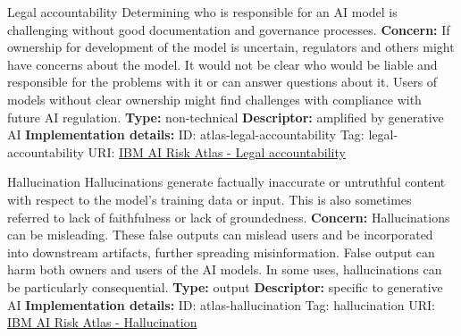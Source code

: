 \begin{definitionbox}{Legal accountability}
Determining who is responsible for an AI model is challenging without good documentation and governance processes.\newline\newline
\textbf{Concern: }If ownership for development of the model is uncertain, regulators and others might have concerns about the model. It would not be clear who would be liable and responsible for the problems with it or can answer questions about it. Users of models without clear ownership might find challenges with compliance with future AI regulation.\newline\newline
\textbf{Type: }non-technical\newline
\textbf{Descriptor: }amplified by generative AI \newline\newline
\textbf{Implementation details: } \newline
ID: atlas-legal-accountability \newline
Tag: legal-accountability \newline
URI:  \href{https://www.ibm.com/docs/en/watsonx/saas?topic=SSYOK8/wsj/ai-risk-atlas/legal-accountability.html}{IBM AI Risk Atlas - Legal accountability}\newline
\end{definitionbox}
\begin{definitionbox}{Hallucination}
Hallucinations generate factually inaccurate or untruthful content with respect to the model's training data or input. This is also sometimes referred to lack of faithfulness or lack of groundedness.\newline\newline
\textbf{Concern: }Hallucinations can be misleading. These false outputs can mislead users and be incorporated into downstream artifacts, further spreading misinformation. False output can harm both owners and users of the AI models. In some uses, hallucinations can be particularly consequential.\newline\newline
\textbf{Type: }output\newline
\textbf{Descriptor: }specific to generative AI \newline\newline
\textbf{Implementation details: } \newline
ID: atlas-hallucination \newline
Tag: hallucination \newline
URI:  \href{https://www.ibm.com/docs/en/watsonx/saas?topic=SSYOK8/wsj/ai-risk-atlas/hallucination.html}{IBM AI Risk Atlas - Hallucination}\newline
\end{definitionbox}
